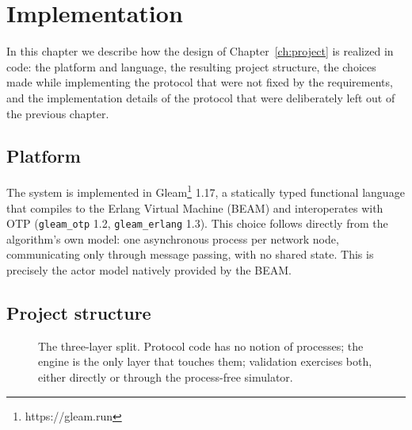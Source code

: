 \chapter{Implementation}

In this chapter we describe how the design of Chapter~\ref{ch:project} is realized in
code: the platform and language, the resulting project structure, the choices made while
implementing the protocol that were not fixed by the requirements, and the implementation
details of the protocol that were deliberately left out of the previous chapter.

\section{Platform}

The system is implemented in Gleam\footnote{https://gleam.run} 1.17, a statically typed
functional language that compiles to the Erlang Virtual Machine (BEAM) and interoperates
with OTP (\texttt{gleam\_otp} 1.2, \texttt{gleam\_erlang} 1.3). This choice follows
directly from the algorithm's own model: one asynchronous process per network node,
communicating only through message passing, with no shared state. This is precisely the
actor model natively provided by the BEAM.

\section{Project structure}

\begin{figure}[htbp]
\centering
{}
\caption{The three-layer split. Protocol code has no notion of processes; the engine is
the only layer that touches them; validation exercises both, either directly or through
the process-free simulator.}
\label{fig:layers}
\end{figure}


